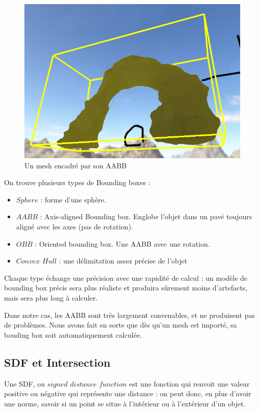 \documentclass{EPUProjetDi}
\begin{document}
\begin{figure}[h]
	\centering
	\includegraphics[scale=.5]{aabb}
	\caption{Un mesh encadré par son AABB}
	\label{fig:aabb}
\end{figure}


On trouve plusieurs types de Bounding boxes :

\begin{itemize}
    \item $Sphere$ : forme d'une sphère.
    \item $AABB$ : Axis-aligned Bounding box. Englobe l'objet dans un pavé toujours aligné avec les axes (pas de rotation).
    \item $OBB$ : Oriented bounding box. Une AABB avec une rotation.
   \item $Convex$ $Hull$ : une délimitation assez précise de l'objet
\end{itemize}

Chaque type échange une précision avec une rapidité de calcul : un modèle de bounding box précis sera plus réaliste et produira sûrement moins d'artefacts, mais sera plus long à calculer. 

Dans notre cas, les AABB sont très largement convenables, et ne produisent pas de problèmes.
Nous avons fait en sorte que dès qu'un mesh est importé, sa bouding box soit automatiquement calculée.

\pagebreak
\subsection{SDF et Intersection}

Une SDF, ou $signed$ $distance$ $function$ est une fonction qui renvoit une valeur positive ou négative qui représente une distance : on peut donc, en plus d'avoir une norme, savoir si un point se situe à l'intérieur ou à l'extérieur d'un objet.
\end{document}
